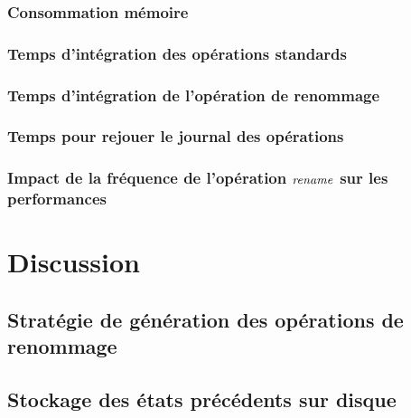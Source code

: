 \subsubsection{Consommation mémoire}


\subsubsection{Temps d'intégration des opérations standards}


\subsubsection{Temps d'intégration de l'opération de renommage}


\subsubsection{Temps pour rejouer le journal des opérations}


\subsubsection{Impact de la fréquence de l'opération $\mathit{rename}$ sur les performances}


\section{Discussion}
\label{sec:discussion}

\subsection{Stratégie de génération des opérations de renommage}


\subsection{Stockage des états précédents sur disque}
\label{sec:offloading-former-states}


